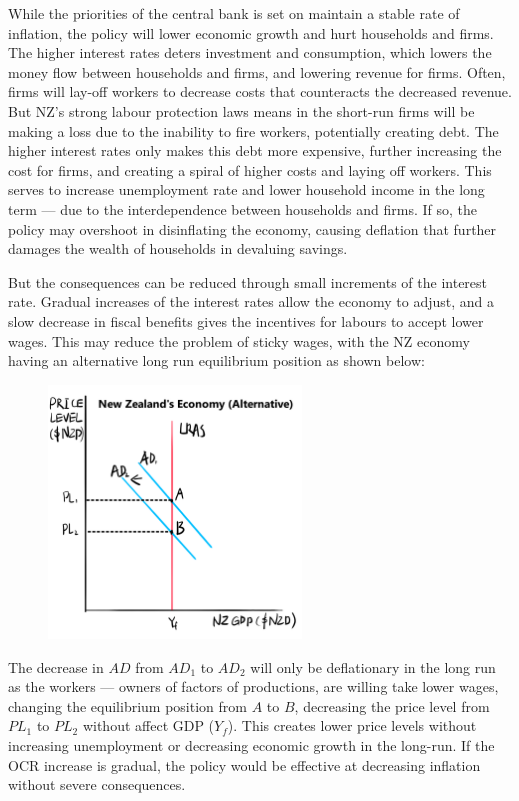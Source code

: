 \documentclass[a4paper,12pt]{article}
\begin{document}

While the priorities of the central bank is set on maintain a stable rate of inflation, the policy will lower economic growth and hurt households and firms. The higher interest rates deters investment and consumption, which lowers the money flow between households and firms, and lowering revenue for firms. Often, firms will lay-off workers to decrease costs that counteracts the decreased revenue. But NZ's strong labour protection laws means in the short-run firms will be making a loss due to the inability to fire workers, potentially creating debt. The higher interest rates only makes this debt more expensive, further increasing the cost for firms, and creating a spiral of higher costs and laying off workers. This serves to increase unemployment rate and lower household income in the long term --- due to the interdependence between households and firms. If so, the policy may overshoot in disinflating the economy, causing deflation that further damages the wealth of households in devaluing savings.

But the consequences can be reduced through small increments of the interest rate. Gradual increases of the interest rates allow the economy to adjust, and a slow decrease in fiscal benefits gives the incentives for labours to accept lower wages. This may reduce the problem of sticky wages, with the NZ economy having an alternative long run equilibrium position as shown below:

\begin{figure}[H]
    \centering
    \includegraphics[width=0.6\textwidth]{assets/macro_alt.png}
\end{figure}

The decrease in $AD$ from $AD_1$ to $AD_2$ will only be deflationary in the long run as the workers --- owners of factors of productions, are willing take lower wages, changing the equilibrium position from $A$ to $B$, decreasing the price level from $PL_1$ to $PL_2$ without affect GDP ($Y_f$). This creates lower price levels without increasing unemployment or decreasing economic growth in the long-run. If the OCR increase is gradual, the policy would be effective at decreasing inflation without severe consequences.
\end{document}
